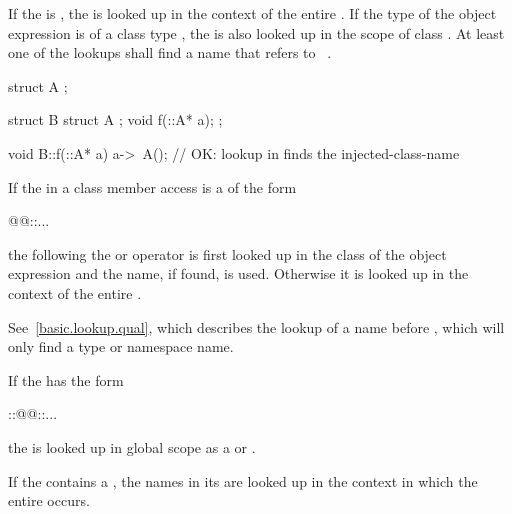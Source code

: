 \pnum
If the  is \tcode{\~}, the
 is looked up in the context of the entire
. If the type  of the object
expression is of a class type , the  is
also looked up in the scope of class . At least one of the
lookups shall find a name that refers to \cv{}~. \begin{example}

\begin{codeblock}
struct A { };

struct B {
  struct A { };
  void f(::A* a);
};

void B::f(::A* a) {
  a->~A();                      // OK: lookup in  finds the injected-class-name
}
\end{codeblock}\end{example}

\pnum
If the  in a class member access is a
 of the form
\begin{codeblock}
@@::...
\end{codeblock}
the  following the  or
\tcode{->} operator is
first looked up in the class of the object expression
and the name, if found,
is used. Otherwise it is looked up in the context of the entire
. \begin{note} See~\ref{basic.lookup.qual}, which
describes the lookup of a name before \tcode{::}, which will only find a type
or namespace name. \end{note}

\pnum
If the  has the form
\begin{codeblock}
::@@::...
\end{codeblock}
the  is looked up in global scope
as a  or .

\pnum
If the  contains a
, the names in its
 are looked up in the context in which the
entire  occurs.

